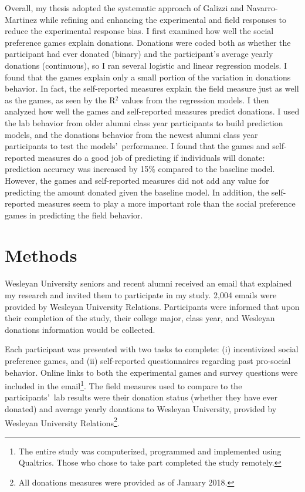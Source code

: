 \documentclass[12pt]{article}
\begin{document}
Overall, my thesis adopted the systematic approach of Galizzi and Navarro-Martinez while refining and enhancing the experimental and field responses to reduce the experimental response bias. I first examined how well the social preference games explain donations. Donations were coded both as whether the participant had ever donated (binary) and the participant\rq s average yearly donations (continuous), so I ran several logistic and linear regression models. I found that the games explain only a small portion of the variation in donations behavior. In fact, the self-reported measures explain the field measure just as well as the games, as seen by the R$^{2}$ values from the regression models. I then analyzed how well the games and self-reported measures predict donations. I used the lab behavior from older alumni class year participants to build prediction models, and the donations behavior from the newest alumni class year participants to test the models\rq \ performance. I found that the games and self-reported measures do a good job of predicting if individuals will donate: prediction accuracy was increased by 15\% compared to the baseline model. However, the games and self-reported measures did not add any value for predicting the amount donated given the baseline model. In addition, the self-reported measures seem to play a more important role than the social preference games in predicting the field behavior.


\section{Methods}
 
Wesleyan University seniors and recent alumni received an email that explained my research and invited them to participate in my study. 2,004 emails were provided by Wesleyan University Relations. Participants were informed that upon their completion of the study, their college major, class year, and Wesleyan donations information would be collected.

Each participant was presented with two tasks to complete: (i) incentivized social preference games, and (ii) self-reported questionnaires regarding past pro-social behavior. Online links to both the experimental games and survey questions were included in the email\footnote{The entire study was computerized, programmed and implemented using Qualtrics. Those who chose to take part completed the study remotely.}. The field measures used to compare to the participants\rq \ lab results were their donation status (whether they have ever donated) and average yearly donations to Wesleyan University, provided by Wesleyan University Relations\footnote{All donations measures were provided as of January 2018.}.
\end{document}
